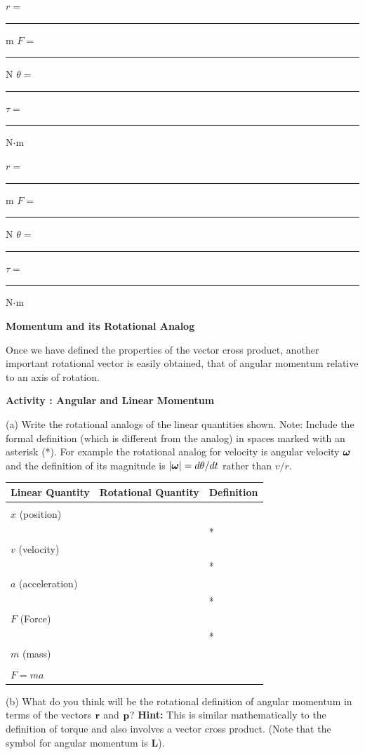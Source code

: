 $r =$ \rule{0.5in}{0.1pt} m \hfill{}$F =$ 
\rule{0.5in}{0.1pt} N \hfill{}\( \theta  =\)
 \rule{0.5in}{0.1pt} \hfill{}\( \tau  =\)  \rule{0.5in}{0.1pt} N\( \cdot  \)m 
\vspace{5mm}

$r = $\rule{0.5in}{0.1pt} m \hfill{}$F =$ \rule{0.5in}{0.1pt} N \hfill{}
\( \theta = \)
\rule{0.5in}{0.1pt} \hfill{}\( \tau  =\)  \rule{0.5in}{0.1pt} N\( \cdot  \)m
\vspace{5mm}

\textbf{Momentum and its Rotational Analog} 

Once we have defined the properties of the vector cross product, another important
rotational vector is easily obtained, that of angular momentum relative to an
axis of rotation. 

\textbf{Activity  : Angular and Linear Momentum }

(a) Write the rotational analogs of the linear quantities shown. Note: Include
the formal definition (which is different from the analog) in spaces marked
with an asterisk ({*}). For example the rotational analog for velocity is angular velocity \( \mbox{\boldmath$\omega$}  \) and the definition of its magnitude is \( |
\mbox{\boldmath$\omega$}  |
= d \theta  /dt\) rather than $v/r$.

\vspace{0.3cm}
{\centering \begin{tabular}{|p{5cm}|p{5cm}|p{5cm}|}
\hline 
Linear Quantity&
Rotational Quantity&
Definition\\
\hline 
\hline 
&
&
\\
$x$ (position) &
&
\\
\hline 
&
&
{*}\\
$v$ (velocity) &
&
\\
\hline 
&
&
{*}\\
$a$ (acceleration) &
&
\\
\hline 
&
&
{*}\\
$F$ (Force) &
&
\\
\hline 
&
&
{*}\\
$m$ (mass) &
&
\\
\hline 
&
&
\\
$F = ma$&
&
\\
\hline 
\end{tabular}\par}
\vspace{0.3cm}

(b) What do you think will be the rotational definition of angular momentum
in terms of the vectors \( {\bf r} \) and \( {\bf p} \)?
\textbf{Hint:} This is similar mathematically to the definition of torque and
also involves a vector cross product. (Note that the symbol for angular momentum is \textbf{L}).
\vspace{20mm}

